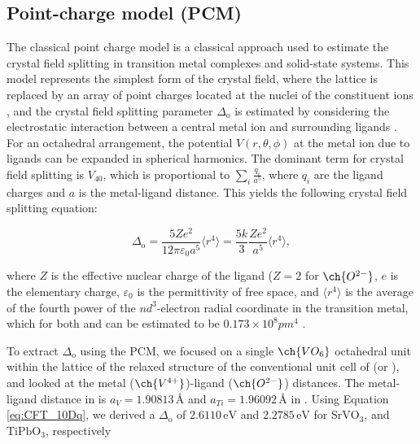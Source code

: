 \documentclass[%
 reprint,
 amsmath,amssymb,
 aps,
]{revtex4-2}
\begin{document}
\subsection*{Point-charge model (PCM)}
The classical point charge model is a classical approach used to estimate the crystal field splitting in transition metal complexes and solid-state systems. This model represents the simplest form of the crystal field, where the lattice is replaced by an array of point charges located at the nuclei of the constituent ions \cite{Morrison1988}, and the crystal field splitting parameter \(\Delta_{\text{o}}\) is estimated by considering the electrostatic interaction between a central metal ion and surrounding ligands \cite{Bethe1929}.
For an octahedral arrangement, the potential \(V(r, \theta, \phi)\) at the metal ion due to ligands can be expanded in spherical harmonics. The dominant term for crystal field splitting is \(V_{40}\), which is proportional to \(\sum_i \frac{q_i}{a^5}\), where \(q_i\) are the ligand charges and \(a\) is the metal-ligand distance. This yields the following crystal field splitting equation:

\begin{equation}
    \Delta_{\text{o}} = \frac{5Ze^2}{12\pi\varepsilon_0 a^5} \langle r^4 \rangle = \frac{5k}{3} \frac{Ze^2}{a^5} \langle r^4 \rangle,
\label{eq:CFT_10Dq}
\end{equation}

where \(Z\) is the effective nuclear charge of the ligand (\(Z=2\) for \(\ch{O^{2-}}\), \(e\) is the elementary charge, \(\varepsilon_0\) is the permittivity of free space, and \(\langle r^4 \rangle\) is the average of the fourth power of the \(nd^3\)-electron radial coordinate in the transition metal, which for both  and  can be estimated to be \(0.173 \times 10^8 pm^4\) \cite{Rogers2014}. 

To extract \(\Delta_{\text{o}}\) using the PCM, we focused on a single \(\ch{VO_6}\) octahedral unit within the lattice of the relaxed structure of the conventional unit cell of  (or  ), and looked at the metal (\(\ch{V^{4+}}\))-ligand (\(\ch{O^{2-}}\)) distances. The metal-ligand distance in  is \(a_V = 1.90813 \, \text{\AA}\) and \(a_{Ti} = 1.96092 \, \text{\AA}\) in  . Using Equation \ref{eq:CFT_10Dq}, we derived a  \(\Delta_{\text{o}}\) of \(2.6110  \, \text{eV}\) and \(2.2785 \, \text{eV}\) for \(\text{SrVO}_3\), and \(\text{TiPbO}_3\), respectively
\end{document}

